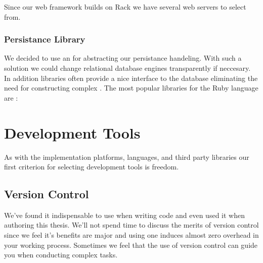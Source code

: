 Since our web framework builds on Rack we have several web servers to select
from.



\subsubsection{Persistance Library}

We decided to use an %
\sidenote{
}
for abstracting our persistance handeling. With such a solution we could
change relational database engines transparently if  neccesary. In addition
 libraries often provide a nice interface to the database
eliminating the need for constructing complex %
\sidenote{
}. The most popular  libraries for the Ruby language are%
:

\begin{items}
\end{items}


\section{Development Tools}

As with the implementation platforms, languages, and third party libraries
our first criterion for selecting development tools is freedom.

\subsection{Version Control}

We've found it indispensable to use  when writing code
and even used it when authoring this thesis. We'll not spend time to discuss
the merits of version control since we feel it's benefits are major and
using one induces almost zero overhead in your working process. Sometimes we
feel that the use of version control can guide you when conducting complex
tasks.

